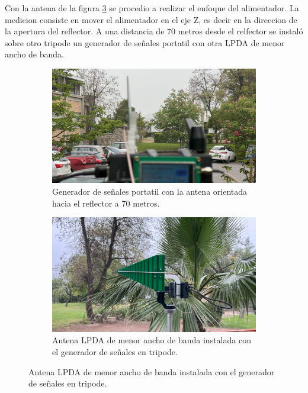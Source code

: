 Con la antena de la figura \ref{fig:antena_lpda} se procedio a realizar el enfoque del alimentador. La medicion consiste en mover el alimentador en el eje Z, es decir en la direccion de la apertura del reflector. A una distancia de 70 metros desde el relfector se instaló sobre otro tripode un generador de señales portatil con otra LPDA de menor ancho de banda.\\

\begin{figure}[h!]
    \centering
    \begin{subfigure}{0.45\textwidth}
        \includegraphics[width=\textwidth]{img/enfoque_cerca}
        \caption{Generador de señales portatil con la antena orientada hacia el reflector a 70 metros.}
        \label{fig:generador}
    \end{subfigure}
    \begin{subfigure}{0.45\textwidth}
        \includegraphics[width=\textwidth]{img/enfoque_cerca1}
        \caption{Antena LPDA de menor ancho de banda instalada con el generador de señales en tripode.}
        \label{fig:antena_lpda}
    \end{subfigure}
\end{figure}

